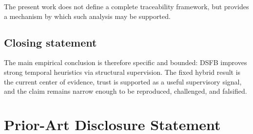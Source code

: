 \documentclass[11pt,letterpaper]{article}
\theoremstyle{gcresult}
\theoremstyle{definition}
\begin{document}
The present work does not define a complete traceability framework, but provides a mechanism by which such analysis may be supported.

\subsection{Closing statement}

The main empirical conclusion is therefore specific and bounded: DSFB improves strong temporal heuristics via structural supervision. The fixed hybrid result is the current center of evidence, trust is supported as a useful supervisory signal, and the claim remains narrow enough to be reproduced, challenged, and falsified.



\section*{Prior-Art Disclosure Statement}
\end{document}
